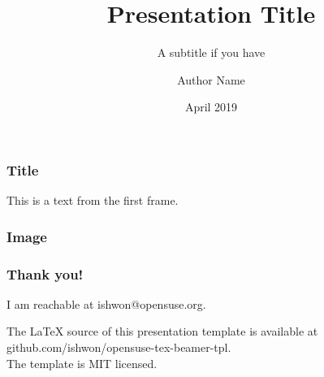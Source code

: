 \documentclass[aspectratio=169]{beamer}
\title{Presentation Title}
\subtitle{A subtitle if you have}
\author{Author Name}
\date{April 2019}
\begin{document}
 
\frame{\titlepage}
 
\begin{frame}
\frametitle{Title}
This is a text from the first frame.
\end{frame}

\begin{frame}
\frametitle{Image}

\end{frame}

\begin{frame}
    \frametitle{Thank you!}
    I am reachable at ishwon@opensuse.org.\vspace{1em}

    \tiny The \LaTeX\hspace{0.01em} source of this presentation template is available at github.com/ishwon/opensuse-tex-beamer-tpl.\\
    The template is MIT licensed.
    \end{frame}
 
\end{document}
